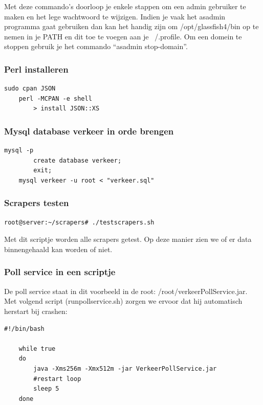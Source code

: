 Met deze commando's doorloop je enkele stappen om een admin gebruiker te maken en het lege wachtwoord te wijzigen. Indien je vaak het asadmin programma gaat gebruiken dan kan het handig zijn om /opt/glassfish4/bin op te nemen in je PATH en dit toe te voegen aan je ~/.profile. Om een domein te stoppen gebruik je het commando ``asadmin stop-domain''.

\subsubsection{Perl installeren}

\begin{lstlisting}[style=BashInputStyle]
	sudo cpan JSON
	perl -MCPAN -e shell
		> install JSON::XS
\end{lstlisting}

\subsubsection{Mysql database verkeer in orde brengen}

\begin{lstlisting}[style=BashInputStyle]
	mysql -p
		create database verkeer;
		exit;
	mysql verkeer -u root < "verkeer.sql"
\end{lstlisting}

\subsubsection{Scrapers testen}

\begin{lstlisting}[style=BashInputStyle]
	root@server:~/scrapers# ./testscrapers.sh
\end{lstlisting}

Met dit scriptje worden alle scrapers getest. Op deze manier zien we of er data binnengehaald kan worden of niet.

\subsubsection{Poll service in een scriptje}

De poll service staat in dit voorbeeld in de root: /root/verkeerPollService.jar.
Met volgend script (runpollservice.sh) zorgen we ervoor dat hij automatisch herstart bij crashen:

\begin{lstlisting}[style=BashInputStyle]
	#!/bin/bash

	while true
	do
   		java -Xms256m -Xmx512m -jar VerkeerPollService.jar
  		#restart loop
   		sleep 5
	done
\end{lstlisting}

